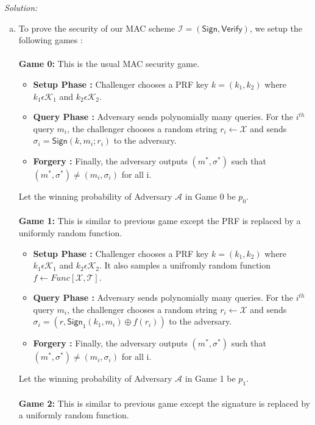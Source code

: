 \documentclass[a4paper, 11pt]{article}
\newenvironment{solution}
    {\textit{Solution:}}
    {\clearpage}
\newcommand{\sign}{\mathsf{Sign}}
\newcommand{\verif}{\mathsf{Verify}}
\newcommand{\calA}{\mathcal{A}}
\newcommand{\calI}{\mathcal{I}}
\newcommand{\calK}{\mathcal{K}}
\newcommand{\calX}{\mathcal{X}}
\newcommand{\calT}{\mathcal{T}}
\begin{document}
\begin{solution}
\begin{enumerate}[(a)]
        \item To prove the security of our MAC scheme $\calI = (\sign, \verif)$, we setup the following games : \\ \\
        \textbf{Game 0:} This is the usual MAC security game.
        \begin{itemize}
                  \item \textbf{Setup Phase :} Challenger chooses a PRF key $k = (k_1, k_2)$ where $k_1 \epsilon \calK_1$ and $k_2 \epsilon \calK_2$.
                  \item \textbf{Query Phase :} Adversary sends polynomially many queries. For the $i^{th}$ query $m_i$, the challenger chooses a random string $r_i \leftarrow \calX$ and sends $\sigma_i = \sign(k, m_i ; r_i)$ to the adversary.
                  \item \textbf{Forgery :} Finally, the adversary outputs $(m^*, \sigma^*)$ such that $(m^*, \sigma^*) \neq (m_i, \sigma_i)$ for all i.
        \end{itemize}
         Let the winning probability of Adversary $\calA$ in Game 0 be $p_0$. \\ \\ 
        \textbf{Game 1:} This is similar to previous game except the PRF is replaced by a uniformly random function.
        \begin{itemize}
                  \item \textbf{Setup Phase :} Challenger chooses a PRF key $k = (k_1, k_2)$ where $k_1 \epsilon \calK_1$ and $k_2 \epsilon \calK_2$. It also samples a unifromly random function $f \leftarrow Func[\calX, \calT]$.
                  \item \textbf{Query Phase :} Adversary sends polynomially many queries. For the $i^{th}$ query $m_i$, the challenger chooses a random string $r_i \leftarrow \calX$ and sends $\sigma_i = (r, \sign_1(k_1, m_i) \oplus f(r_i))$ to the adversary.
                  \item \textbf{Forgery :} Finally, the adversary outputs $(m^*, \sigma^*)$ such that $(m^*, \sigma^*) \neq (m_i, \sigma_i)$ for all i.
        \end{itemize}
         Let the winning probability of Adversary $\calA$ in Game 1 be $p_1$. \\ \\ 
        \textbf{Game 2:} This is similar to previous game except the signature is replaced by a uniformly random function.
        \begin{itemize}

\end{itemize}
\end{enumerate}
\end{solution}
\end{document}
